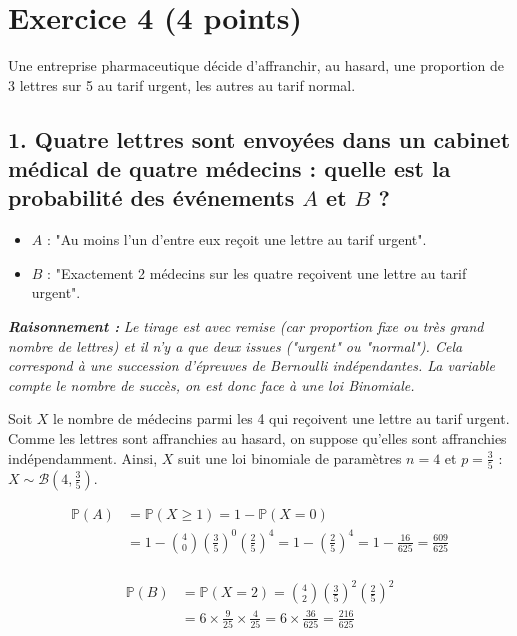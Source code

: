 \documentclass[11pt,a4paper]{article}
\newcommand{\explication}[1]{
    \vspace{0.2cm}
    \noindent\textcolor{blue!80!black}{
        \textbf{\textit{Raisonnement : }} \textit{#1}
    }
    \vspace{0.2cm}
}
\begin{document}
\vspace{0.5cm}

\section*{Exercice 4 (4 points)}
Une entreprise pharmaceutique décide d'affranchir, au hasard, une proportion de 3 lettres sur 5 au tarif urgent, les autres au tarif normal.

\subsection*{1. Quatre lettres sont envoyées dans un cabinet médical de quatre médecins : quelle est la probabilité des événements $A$ et $B$ ?}
\begin{itemize}
    \item $A$ : "Au moins l'un d'entre eux reçoit une lettre au tarif urgent".
    \item $B$ : "Exactement 2 médecins sur les quatre reçoivent une lettre au tarif urgent".
\end{itemize}

\explication{Le tirage est avec remise (car proportion fixe ou très grand nombre de lettres) et il n'y a que deux issues ("urgent" ou "normal"). Cela correspond à une succession d'épreuves de Bernoulli indépendantes. La variable compte le nombre de succès, on est donc face à une loi Binomiale.}

Soit $X$ le nombre de médecins parmi les 4 qui reçoivent une lettre au tarif urgent. \\
Comme les lettres sont affranchies au hasard, on suppose qu'elles sont affranchies indépendamment. Ainsi, $X$ suit une loi binomiale de paramètres $n=4$ et $p=\frac{3}{5}$ : $X \sim \mathcal{B}\left(4, \frac{3}{5}\right)$.

\begin{align*}
    \mathbb{P}(A) &= \mathbb{P}(X \ge 1) = 1 - \mathbb{P}(X=0) \\
    &= 1 - \binom{4}{0}\left(\frac{3}{5}\right)^0\left(\frac{2}{5}\right)^4 = 1 - \left(\frac{2}{5}\right)^4 = 1 - \frac{16}{625} = \frac{609}{625} \\
\end{align*}

\begin{align*}
    \mathbb{P}(B) &= \mathbb{P}(X=2) = \binom{4}{2}\left(\frac{3}{5}\right)^2\left(\frac{2}{5}\right)^2 \\
    &= 6 \times \frac{9}{25} \times \frac{4}{25} = 6 \times \frac{36}{625} = \frac{216}{625}
\end{align*}
\end{document}
